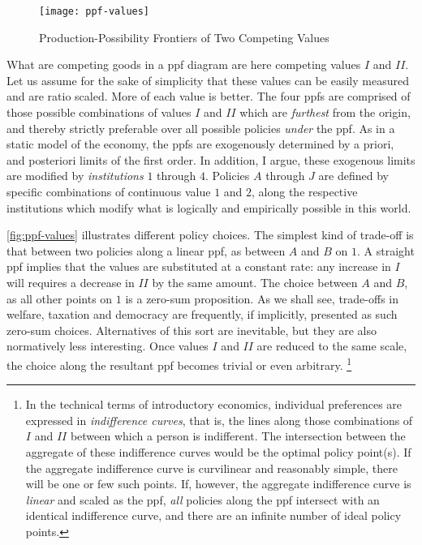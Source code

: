 \begin{figure}[htbp]
	\centering
	\texttt{[image: ppf-values]}
	\caption{Production-Possibility Frontiers of Two Competing Values}
	\label{fig:ppf-values}
\end{figure}%

What are competing goods in a \gls{ppf} diagram are here competing values $I$ and $II$.
Let us assume for the sake of simplicity that these values can be easily measured and are ratio scaled.
More of each value is better.
The four \glspl{ppf} are comprised of those possible combinations of values $I$ and $II$ which are \emph{furthest} from the origin, and thereby strictly preferable over all possible policies \emph{under} the \gls{ppf}.
As in a static model of the economy, the \glspl{ppf} are exogenously determined by a priori, and posteriori limits of the first order.
In addition, I argue, these exogenous limits are modified by \emph{institutions} $1$ through $4$.
Policies $A$ through $J$ are defined by specific combinations of continuous value $1$ and $2$, along the respective institutions which modify what is logically and empirically possible in this world.

\autoref{fig:ppf-values} illustrates different policy choices.
The simplest kind of trade-off is that between two policies along a linear \gls{ppf}, as between $A$ and $B$ on $1$.
A straight \gls{ppf} implies that the values are substituted at a constant rate:
any increase in $I$ will requires a decrease in $II$ by the same amount.
The choice between $A$ and $B$, as all other points on $1$ is a zero-sum proposition.
As we shall see, trade-offs in welfare, taxation and democracy are frequently, if implicitly, presented as such zero-sum choices.
Alternatives of this sort are inevitable, but they are also normatively less interesting.
Once values $I$ and $II$ are reduced to the same scale, the choice along the resultant \gls{ppf} becomes trivial or even arbitrary.
\footnote{
	In the technical terms of introductory economics, individual preferences are expressed in \emph{indifference curves}, that is, the lines along those combinations of $I$ and $II$ between which a person is indifferent.
	The intersection between the aggregate of these indifference curves would be the optimal policy point(s).
	If the aggregate indifference curve is curvilinear and reasonably simple, there will be one or few such points.
	If, however, the aggregate indifference curve is \emph{linear} and scaled as the \gls{ppf}, \emph{all} policies along the \gls{ppf} intersect with an identical indifference curve, and there are an infinite number of ideal policy points.
}

